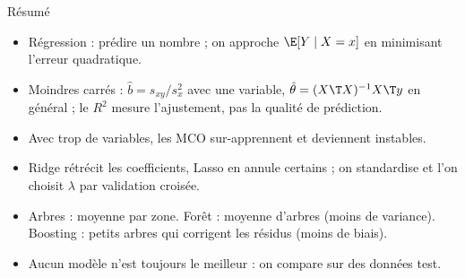 \documentclass[aspectratio=169,11pt]{beamer}
\begin{document}
\begin{frame}{Résumé}
  \begin{itemize}
    \item Régression : prédire un nombre ; on approche $\E[Y\mid X=x]$ en minimisant l'erreur quadratique.
    \item Moindres carrés : $\hat b=s_{xy}/s_x^2$ avec une variable, $\hat\theta=(X\T X)^{-1}X\T y$ en général ; le $R^2$ mesure l'ajustement, pas la qualité de prédiction.
    \item Avec trop de variables, les MCO sur-apprennent et deviennent instables.
    \item Ridge rétrécit les coefficients, Lasso en annule certains ; on standardise et l'on choisit $\lambda$ par validation croisée.
    \item Arbres : moyenne par zone. Forêt : moyenne d'arbres (moins de variance). Boosting : petits arbres qui corrigent les résidus (moins de biais).
    \item Aucun modèle n'est toujours le meilleur : on compare sur des données test.
  \end{itemize}
\end{frame}
\end{document}
